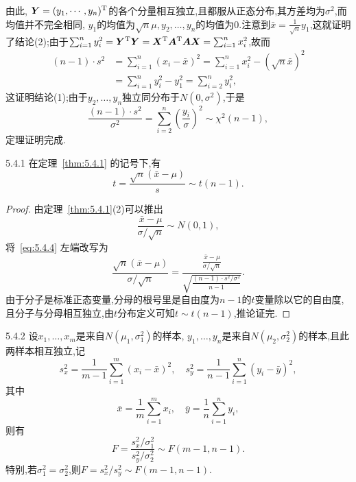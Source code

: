 由此, $\bm Y=(y_1,\cdots,y_n)^{\mathrm T}$的各个分量相互独立,且都服从正态分布,其方差均为$\sigma^2$,而均值并不完全相同, $y_1$的均值为$\sqrt n\mu,y_2,\dotsc,y_n$的均值为$0$.注意到$\bar x=\frac1{\sqrt n}y_1$,这就证明了结论(2);由于$\sum_{i=1}^ny_i^2=\bm Y^{\mathrm T}\bm Y=\bm X^{\mathrm T}\bm A^{\mathrm T}\bm A\bm X=\sum_{i=1}^nx_i^2$,故而
\begin{align*}
(n-1)\cdot s^2&=\sum_{i=1}^n(x_i-\bar x)^2=\sum_{i=1}^nx_i^2-(\sqrt n\bar x)^2\\
&=\sum_{i=1}^ny_i^2-y_1^2=\sum_{i=2}^ny_i^2,
\end{align*}
这证明结论(1);由于$y_2,\dotsc,y_n$独立同分布于$N(0,\sigma^2)$,于是
\begin{equation}\label{eq:5.4.3}
\frac{(n-1)\cdot s^2}{\sigma^2}=\sum_{i=2}^n\left(\frac{y_i}\sigma\right)^2\sim\chi^2(n-1),
\end{equation}
定理证明完成.
\begin{corollary}{}{5.4.1}
在定理~\ref{thm:5.4.1} 的记号下,有
\begin{equation}\label{eq:5.4.4}
t=\frac{\sqrt n(\bar x-\mu)}s\sim t(n-1).
\end{equation}
\end{corollary}
\begin{proof}
由定理~\ref{thm:5.4.1}(2)可以推出
\begin{equation}\label{eq:5.4.5}
\frac{\bar x-\mu}{\sigma/\sqrt n}\sim N(0,1),
\end{equation}
将~\ref{eq:5.4.4} 左端改写为
\begin{equation}\label{eq:5.4.6}
\frac{\sqrt{n}\left( \bar{x}-\mu \right)}{\sigma /\sqrt{n}}=\frac{\frac{\bar{x}-\mu}{\sigma /\sqrt{n}}}{\sqrt{\frac{\left( n-1 \right) \cdot s^2/\sigma ^2}{n-1}}}.
\end{equation}
由于分子是标准正态变量,分母的根号里是自由度为$n-1$的$t$变量除以它的自由度,且分子与分母相互独立,由$t$分布定义可知$t\sim t(n-1)$,推论证完.
\end{proof}
\begin{corollary}{}{5.4.2}
设$x_1,\dotsc,x_m$是来自$N(\mu_1,\sigma_1^2)$的样本, $y_1,\dotsc,y_n$是来自$N(\mu_2,\sigma_2^2)$的样本,且此两样本相互独立,记
\[s_x^2=\frac1{m-1}\sum_{i=1}^m(x_i-\bar x)^2,\quad s_y^2=\frac1{n-1}\sum_{i=1}^n
(y_i-\bar y)^2,\]
其中
\[\bar x=\frac1m\sum_{i=1}^m x_i,\quad \bar y=\frac1n\sum_{i=1}^ny_i,\]
则有
\begin{equation}\label{eq5.4.7}
F=\frac{s_x^2/\sigma_1^2}{s_y^2/\sigma_2^2}\sim F(m-1,n-1).
\end{equation}
特别,若$\sigma_1^2=\sigma_2^2$,则$F=s_x^2/s_y^2\sim F(m-1,n-1)$.
\end{corollary}
